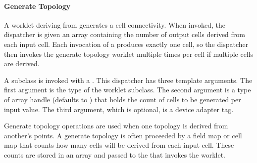 
\paragraph{Generate Topology}


A worklet deriving from  generates a cell
connectivity. When invoked, the dispatcher is given an array containing the
number of output cells derived from each input cell. Each invocation of a
 produces exactly one cell, so the
dispatcher then invokes the generate topology worklet multiple times per
cell if multiple cells are derived.

A  subclass is invoked with a
. This dispatcher has three template
arguments. The first argument is the type of the worklet subclass. The
second argument is a type of array handle (defaults to
\textcode{<}\textcode{>}) that holds the count
of cells to be generated per input value. The third argument, which is
optional, is a device adapter tag.

Generate topology operations are used when one topology is derived from
another's points. A generate topology is often proceeded by a field map or
cell map that counts how many cells will be derived from each input
cell. These counts are stored in an array and passed to the
 that invokes the worklet.

